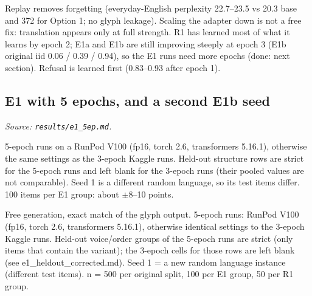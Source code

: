 \documentclass[10pt,a4paper,oneside]{article}
\begin{document}
\begin{infer}Replay removes forgetting (everyday-English perplexity 22.7--23.5 vs 20.3 base and 372 for Option 1; no glyph
leakage). Scaling the adapter down is not a free fix: translation appears only at full strength. R1 has learned most
of what it learns by epoch 2; E1a and E1b are still improving steeply at epoch 3 (E1b original iid 0.06 / 0.39 / 0.94),
so the E1 runs need more epochs (done: next section). Refusal is learned first (0.83--0.93 after epoch 1).\end{infer}
\subsection{E1 with 5 epochs, and a second E1b seed}
\textit{Source: \texttt{results/e1\_5ep.md}.}


\begin{caveat}5-epoch runs on a RunPod V100 (fp16, torch 2.6, transformers 5.16.1), otherwise the same settings as the 3-epoch
Kaggle runs. Held-out structure rows are strict for the 5-epoch runs and left blank for the 3-epoch runs (their pooled
values are not comparable). Seed 1 is a different random language, so its test items differ. 100 items per E1 group:
about $\pm$8--10 points.\end{caveat}
Free generation, exact match of the glyph output. 5-epoch runs: RunPod V100 (fp16, torch 2.6, transformers 5.16.1), otherwise identical settings to the 3-epoch Kaggle runs. Held-out voice/order groups of the 5-epoch runs are strict (only items that contain the variant); the 3-epoch cells for those rows are left blank (see e1\_heldout\_corrected.md). Seed 1 = a new random language instance (different test items). n = 500 per original split, 100 per E1 group, 50 per R1 group.
\end{document}
